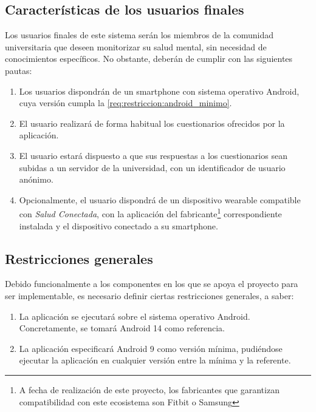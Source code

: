     \subsection{Características de los usuarios finales}
        \label{req:descripcion:usuarios}
        
        Los usuarios finales de este sistema serán los miembros de la comunidad universitaria que deseen monitorizar su salud mental, sin necesidad de conocimientos específicos. No obstante, deberán de cumplir con las siguientes pautas:
    
        \begin{enumerate}
            \item Los usuarios dispondrán de un \gls{smartphone} con sistema operativo Android, cuya versión cumpla la \ref{req:restriccion:android_minimo}.
            \item El usuario realizará de forma habitual los cuestionarios ofrecidos por la aplicación.
            \item El usuario estará dispuesto a que sus respuestas a los cuestionarios sean subidas a un servidor de la universidad, con un identificador de usuario anónimo.
            \item Opcionalmente, el usuario dispondrá de un dispositivo \gls{wearable} compatible con \textit{Salud Conectada}, con la aplicación del fabricante\footnote{A fecha de realización de este proyecto, los fabricantes que garantizan compatibilidad con este ecosistema son Fitbit o Samsung} correspondiente instalada y el dispositivo conectado a su \gls{smartphone}.
            
        \end{enumerate}
        
    \subsection{Restricciones generales}
        \label{req:descripcion:restricciones}
        Debido funcionalmente a los componentes en los que se apoya el proyecto para ser implementable, es necesario definir ciertas restricciones generales, a saber:
        \begin{enumerate}[label=\textbf{RG-\arabic*}]
            \item \label{req:restriccion:android_referencia} La aplicación se ejecutará sobre el sistema operativo Android. Concretamente, se tomará Android 14 como referencia.
            \item \label{req:restriccion:android_minimo} La aplicación especificará Android 9 como versión mínima, pudiéndose ejecutar la aplicación en cualquier versión entre la mínima y la referente.
        \end{enumerate}
    
